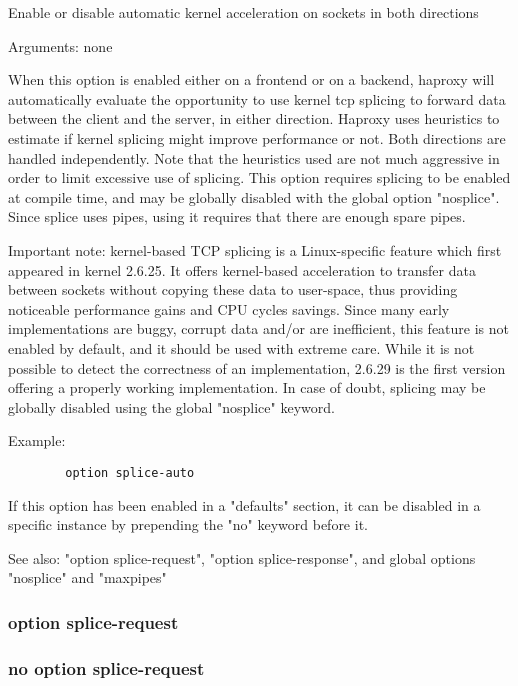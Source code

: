 
  Enable or disable automatic kernel acceleration on sockets in both directions
  

  Arguments: none

  When this option is enabled either on a frontend or on a backend, haproxy
  will automatically evaluate the opportunity to use kernel tcp splicing to
  forward data between the client and the server, in either direction. Haproxy
  uses heuristics to estimate if kernel splicing might improve performance or
  not. Both directions are handled independently. Note that the heuristics used
  are not much aggressive in order to limit excessive use of splicing. This
  option requires splicing to be enabled at compile time, and may be globally
  disabled with the global option "nosplice". Since splice uses pipes, using it
  requires that there are enough spare pipes.

  Important note: kernel-based TCP splicing is a Linux-specific feature which
  first appeared in kernel 2.6.25. It offers kernel-based acceleration to
  transfer data between sockets without copying these data to user-space, thus
  providing noticeable performance gains and CPU cycles savings. Since many
  early implementations are buggy, corrupt data and/or are inefficient, this
  feature is not enabled by default, and it should be used with extreme care.
  While it is not possible to detect the correctness of an implementation,
  2.6.29 is the first version offering a properly working implementation. In
  case of doubt, splicing may be globally disabled using the global "nosplice"
  keyword.

  Example:
  \begin{verbatim}
        option splice-auto
  \end{verbatim}

  If this option has been enabled in a "defaults" section, it can be disabled
  in a specific instance by prepending the "no" keyword before it.

  See also: "option splice-request", "option splice-response", and global
             options "nosplice" and "maxpipes"

\subsubsection{option splice-request}
\subsubsection{no option splice-request}

